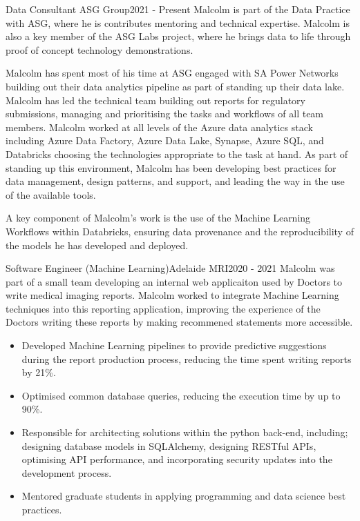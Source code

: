 

\begin{cventry}{Data Consultant} {ASG Group}{}{2021 - Present}
  Malcolm is part of the Data Practice with ASG,
  where he is contributes mentoring and technical expertise.
  Malcolm is also a key member of the ASG Labs project,
  where he brings data to life through
  proof of concept technology demonstrations.

  Malcolm has spent most of his time at ASG engaged with SA Power Networks
  building out their data analytics pipeline
  as part of standing up their data lake.
  Malcolm has led the technical team
  building out reports for regulatory submissions,
  managing and prioritising the
  tasks and workflows of all team members.
  Malcolm worked at all levels of the Azure data analytics stack
  including Azure Data Factory, Azure Data Lake, Synapse, Azure SQL, and Databricks
  choosing the technologies appropriate to the task at hand.
  As part of standing up this environment,
  Malcolm has been developing best practices
  for data management, design patterns, and support,
  and leading the way in the use of the available tools.

  A key component of Malcolm's work is the use of
  the Machine Learning Workflows within Databricks,
  ensuring data provenance and the reproducibility of the models
  he has developed and deployed.
\end{cventry}

\begin{cventry}{Software Engineer (Machine Learning)}{Adelaide MRI}{}{2020 - 2021}
  Malcolm was part of a small team developing an internal web applicaiton
  used by Doctors to write medical imaging reports.
  Malcolm worked to integrate Machine Learning techniques 
  into this reporting application,
  improving the experience of the Doctors writing these reports
  by making recommened statements more accessible.
  \begin{itemize}
    \item Developed Machine Learning pipelines to provide predictive
      suggestions during the report production process, reducing the time spent
      writing reports by 21\%.
    \item Optimised common database queries, reducing the execution time by
      up to 90\%.
    \item Responsible for architecting solutions
      within the python back-end, including;
      designing database models in SQLAlchemy,
      designing RESTful APIs,
      optimising API performance,
      and incorporating security updates into the development process.
    \item Mentored graduate students in applying programming and data science
      best practices.
  \end{itemize}
\end{cventry}

